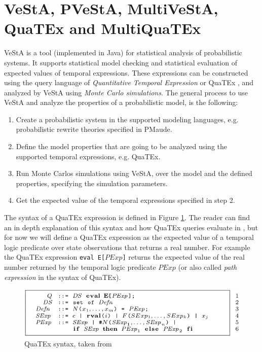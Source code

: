 \section{VeStA, PVeStA, MultiVeStA, QuaTEx and MultiQuaTEx}
VeStA \cite{Vesta} is a tool (implemented in Java) for statistical analysis of probabilistic systems. It supports statistical model checking and statistical evaluation of expected values of temporal expressions. These expressions can be constructed using the query language of  \textit{Quantitative Temporal Expression} or QuaTEx \cite{Agha2006}, and analyzed by VeStA using \textit{Monte Carlo simulations}. The general process to use VeStA and analyze the properties of a probabilistic model, is the following:
\begin{enumerate}
    \item Create a probabilistic system in the supported modeling languages, e.g. probabilistic rewrite theories specified in PMaude.
    \item Define the model properties that are going to be analyzed using the supported temporal expressions, e.g. QuaTEx.
    \item Run Monte Carlos simulations using VeStA, over the model and the defined properties, specifying the simulation parameters.
    \item Get the expected value of the temporal expressions specified in step 2.
\end{enumerate}
The syntax of a QuaTEx expression is defined in Figure \ref{fig:multivesta}. The reader can find an in depth explanation of this syntax and how QuaTEx queries evaluate in \cite{Agha2006,multivesta}, but for now we will define a QuaTEx expression as the expected value of a temporal logic predicate over state observations that returns a real number. For example the QuaTEx expression \texttt{eval E[$PExp$]} returns the expected value of the real number returned by the temporal logic predicate $PExp$ (or also called \textit{path expression} in the syntax of QuaTEx).  
\begin{figure}[h]
    \centering
    \includegraphics[scale = 0.4]{images/quatex1.png}
    \caption{QuaTEx syntax, taken from \cite{multivesta}}
    \label{fig:multivesta}
\end{figure}

